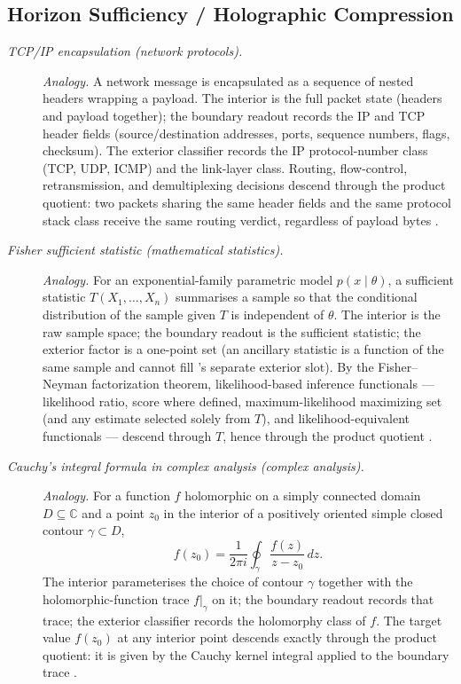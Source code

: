 \subsection*{ Horizon Sufficiency / Holographic Compression}
\begingroup\small
\begin{description}
\item[\emph{{TCP/IP} encapsulation (network protocols).}] \textit{Analogy.}
A network message is encapsulated as a sequence of
nested headers wrapping a payload.  The interior is the
full packet state (headers and payload together); the
boundary readout records the IP and TCP header fields
(source/destination addresses, ports, sequence numbers,
flags, checksum).  The exterior classifier records the
IP protocol-number class (TCP, UDP, ICMP) and the
link-layer class.  Routing, flow-control, retransmission,
and demultiplexing decisions descend through the product
quotient: two packets sharing the same header fields and
the same protocol stack class receive the same routing
verdict, regardless of payload bytes
\citep{Postel1981RFC791,Postel1981RFC793}.

\item[\emph{Fisher sufficient statistic (mathematical
statistics).}] \textit{Analogy.}
For an exponential-family parametric model
\(p(x\mid\theta)\), a sufficient statistic
\(T(X_1,\dots,X_n)\) summarises a sample so that the
conditional distribution of the sample given \(T\) is
independent of \(\theta\).  The interior is the raw
sample space; the boundary readout is the sufficient
statistic; the exterior factor is a one-point set (an ancillary statistic is a function of the same sample and cannot fill 's separate exterior slot).  By the Fisher--Neyman factorization theorem,
likelihood-based inference functionals --- likelihood
ratio, score where defined, maximum-likelihood maximizing set (and any estimate selected solely from \(T\)), and
likelihood-equivalent functionals --- descend through \(T\), hence through
the product quotient \citep{Fisher1922Mathematical}.

\item[\emph{Cauchy's integral formula in complex analysis
(complex analysis).}] \textit{Analogy.}
For a function \(f\) holomorphic on a simply connected
domain \(D\subseteq\mathbb C\) and a point \(z_0\) in
the interior of a positively oriented simple closed
contour \(\gamma\subset D\),
\[
  f(z_0)=\frac{1}{2\pi i}\oint_\gamma \frac{f(z)}{z-z_0}\,
  dz.
\]
The interior parameterises the choice of contour
\(\gamma\) together with the holomorphic-function trace
\(f|_\gamma\) on it; the boundary readout records that
trace; the exterior classifier records the holomorphy
class of \(f\).  The target value \(f(z_0)\) at any
interior point descends exactly through the product
quotient: it is given by the Cauchy kernel integral
applied to the boundary trace
\citep{Ahlfors1979ComplexAnalysis}.
\end{description}
\endgroup

